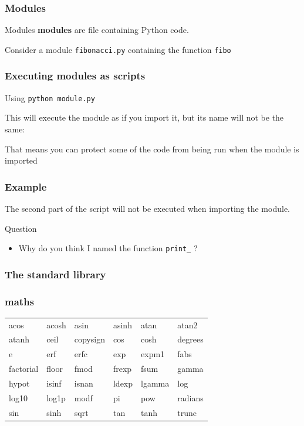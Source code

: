\documentclass[xcolor=dvipsnames]{beamer}
\begin{document}
\begin{frame}
\frametitle{Modules}
\begin{block}{Modules}
\textbf{modules} are file containing Python code.
\end{block}

\vspace{1em}
Consider a module \texttt{fibonacci.py} containing the function \texttt{fibo}


\end{frame}

\begin{frame}
\frametitle{Executing modules as scripts}
\begin{block}{Using}
\texttt{python module.py}
\end{block}

\vspace{1em}

This will execute the module as if you import it, but its name will not be
the same:



That means you can protect some of the code from being run when the module is
imported

\end{frame}

\begin{frame}
\frametitle{Example}

\vspace{2em}
The second part of the script will not be executed when importing the module.

\begin{alertblock}{Question}
\begin{itemize}
\item Why do you think I named the function \texttt{print\_} ?
\end{itemize}
\end{alertblock}

\end{frame}

\begin{frame}
\frametitle{The standard library}
\end{frame}

\begin{frame}
\frametitle{maths}
\begin{tabular}{llllll}
acos & acosh & asin & asinh & atan & atan2\\
atanh & ceil & copysign & cos & cosh & degrees \\
e & erf & erfc & exp & expm1 & fabs \\
factorial & floor & fmod & frexp & fsum & gamma \\
hypot & isinf & isnan & ldexp & lgamma & log \\
log10 & log1p & modf & pi & pow & radians \\
sin & sinh & sqrt & tan & tanh & trunc \\
\end{tabular}

\end{frame}
\end{document}
